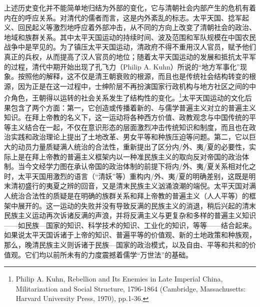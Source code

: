 \documentclass[a4paper, 12pt, openright]{ctexbook}
\begin{document}
上述历史变化并不能简单地归结为外部的变化，它与清朝社会内部产生的危机有着内在的呼应关系。对清代的儒者而言，这是内外紊乱的标志。太平天国、捻军起义、回民起义等激烈地呼应着外部冲击，从不同的方向上改变了清朝社会的政治、地域和族群关系。其中太平天国运动的持续时间、波及范围和军队规模在中国农民战争中是罕见的。为了镇压太平天国运动，清政府不得不重用汉人官员，赋予他们真正的兵权，从而提高了汉人官员的地位；随着太平天国运动的发展和抵抗太平军的过程，清代中期开始出现了孔飞力（Philip A. Kuhn）所说的“地方军事化”现象。按照他的解释，这不仅是清王朝衰败的根源，而且也是传统社会结构转变的根源，因为正是在这一过程中，士绅阶层不再扮演国家行政机构与地方社区之间的中介角色，王朝得以运转的社会关系发生了结构性的变化。\footnote{Philip A. Kuhn, Rebellion and Its Enemies in Late Imperial China, Militarization and Social Structure, 1796-1864 (Cambridge, Massachusetts: Harvard University Press, 1970), pp.1-36.}太平天国运动的文化后果包含了两个方面：第一，它创造或传播着新的、与儒学普遍主义对立的普遍主义知识。在拜上帝教的名义下，这一运动将各种西方价值、政教观念与中国传统的平等主义结合在一起，不仅在意识形态的层面激烈冲击传统知识和制度，而且也在政治实践和政治理论上提出了土地改革、男女平等和种族压迫等问题。第二，它以巨大的动员力量质疑满人统治的合法性，重新提出了区分内/外、夷/夏的必要性，实际上是在拜上帝教的普遍主义框架内以一种准民族主义的取向反对帝国的政治体制。当今文经学力图在承认帝国的政治体制的前提下将内/外、夷/夏关系相对化之时，太平天国用激烈的语言（“清妖”等）重构内/外、夷/夏的明确差别，这既是明末清初盛行的夷夏之辨的回音，又是清末民族主义汹涌浪潮的端倪。太平天国对满人统治合法性的质疑是在明确的族群关系和拜上帝教的普遍主义（人人平等）的框架中展开的。这一运动的失败并没有导致反满的民族主义的消退，稍后兴起的清末民族主义运动再次诉诸反满的声浪，并将反满主义与更复杂和多样的普遍主义知识——如民族—国家的知识、科学技术的知识、工业化的知识，等等——结合起来。如果说太平天国诉诸于上帝的知识、普遍平等的价值观、新的土地政策和种族观，那么，晚清民族主义则诉诸于民族—国家的政治模式，以及自由、平等和共和的价值观。它们均以前所未有的力度震撼着儒学“万世法”的基础。
\end{document}
